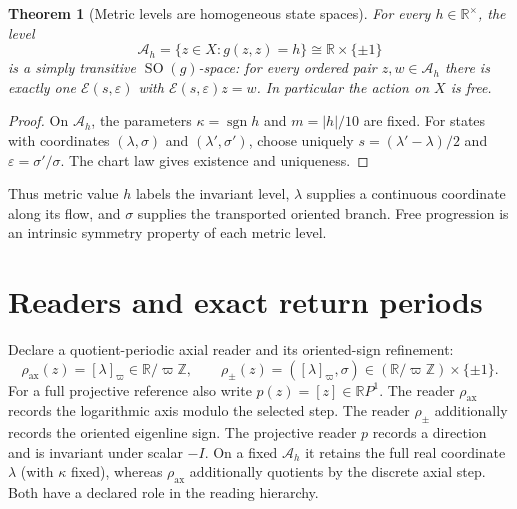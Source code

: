 \documentclass[10pt,letterpaper]{article}
\newtheorem{theorem}{Theorem}[section]
\theoremstyle{definition}\newtheorem{definition}[theorem]{Definition}
\newcommand{\RR}{\mathbb R}
\newcommand{\ZZ}{\mathbb Z}
\newcommand{\eps}{\varepsilon}
\newcommand{\sgn}{\operatorname{sgn}}
\newcommand{\SO}{\operatorname{SO}}
\newcommand{\Ah}{\mathcal A_h}
\newcommand{\varp}{\varpi}
\newcommand{\rhoax}{\rho_{\mathrm{ax}}}
\newcommand{\rhos}{\rho_{\pm}}
\begin{document}
\begin{theorem}[Metric levels are homogeneous state spaces]\label{thm:torsor}
For every $h\in\RR^\times$, the level
\begin{equation}
 \Ah=\{z\in X:g(z,z)=h\}\cong\RR\times\{\pm1\}
\end{equation}
is a simply transitive $\SO(g)$-space: for every ordered pair $z,w\in\Ah$ there is exactly one $\mathcal E(s,\eps)$ with $\mathcal E(s,\eps)z=w$. In particular the action on $X$ is free.
\end{theorem}
\begin{proof}
On $\Ah$, the parameters $\kappa=\sgn h$ and $m=|h|/10$ are fixed. For states with coordinates $(\lambda,\sigma)$ and $(\lambda',\sigma')$, choose uniquely $s=(\lambda'-\lambda)/2$ and $\eps=\sigma'/\sigma$. The chart law gives existence and uniqueness.
\end{proof}

Thus metric value $h$ labels the invariant level, $\lambda$ supplies a continuous coordinate along its flow, and $\sigma$ supplies the transported oriented branch. Free progression is an intrinsic symmetry property of each metric level.

\section{Readers and exact return periods}
Declare a quotient-periodic axial reader and its oriented-sign refinement:
\begin{equation}\label{eq:readers}
 \rhoax(z)=[\lambda]_{\varp}\in\RR/\varp\ZZ,
 \qquad \rhos(z)=([\lambda]_{\varp},\sigma)\in(\RR/\varp\ZZ)\times\{\pm1\}.
\end{equation}
For a full projective reference also write $p(z)=[z]\in\RR P^1$. The reader $\rhoax$ records the logarithmic axis modulo the selected step. The reader $\rhos$ additionally records the oriented eigenline sign. The projective reader $p$ records a direction and is invariant under scalar $-I$. On a fixed $\Ah$ it retains the full real coordinate $\lambda$ (with $\kappa$ fixed), whereas $\rhoax$ additionally quotients by the discrete axial step. Both have a declared role in the reading hierarchy.
\end{document}
